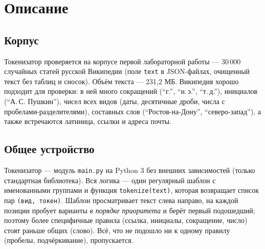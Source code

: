 \pagebreak
\section{Описание}

\subsection{Корпус}
Токенизатор проверяется на корпусе первой лабораторной работы --- 30\,000 случайных
статей русской Википедии (поле \texttt{text} в JSON-файлах, очищенный текст без
таблиц и сносок). Объём текста --- 231{,}2 МБ. Википедия хорошо подходит для
проверки: в ней много сокращений (\enquote{г.}, \enquote{н.\,э.}, \enquote{т.\,д.}),
инициалов (\enquote{А.\,С. Пушкин}), чисел всех видов (даты, десятичные дроби,
числа с пробелами-разделителями), составных слов (\enquote{Ростов-на-Дону},
\enquote{северо-запад}), а также встречаются латиница, ссылки и адреса почты.

\subsection{Общее устройство}
Токенизатор --- модуль \texttt{main.py} на Python 3 без внешних зависимостей
(только стандартная библиотека). Вся логика --- один регулярный
шаблон с именованными группами и функция \texttt{tokenize(text)}, которая
возвращает список пар \texttt{(вид, токен)}. Шаблон просматривает текст слева
направо, на каждой позиции пробует варианты \emph{в порядке приоритета} и берёт
первый подошедший; поэтому более специфичные правила (ссылка, инициалы,
сокращение, число) стоят раньше общих (слово). Всё, что не подошло ни к одному
правилу (пробелы, подчёркивание), пропускается.

